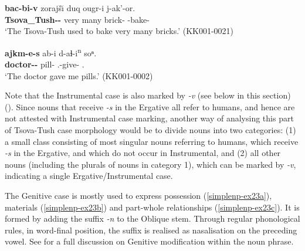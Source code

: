 \begin{exe}
	\ex\label{simplenp-ex22}
	\begin{xlist}
		

			\ex\label{simplenp-ex22a}
			\gll \textbf{bac-bi-v} zorajš\u{\i} duq ougr-i j-ak'-or. \\
			\textbf{Tsova\_Tush-{\Pl}-{\Erg}} very many brick-{\Pl} {\J}-bake-{\Imprf} \\
			\trans `The Tsova-Tush used to bake very many bricks.'
			\hfill (KK001-0021)

		

			\ex\label{simplenp-ex22b}
			\gll \textbf{ajkm-e-s} ab-i d-aɬ-i\textsuperscript{n} soⁿ. \\
			\textbf{doctor-{\Obl}-{\Erg}} pill-{\Pl} {\B}.{\Pl}-give-{\Aor} {\Fsg}.{\Dat} \\
			\trans `The doctor gave me pills.'
			\hfill (KK001-0002)

		
	\end{xlist}
\end{exe}

Note that the Instrumental case is also marked by \textit{-v} (see below in this section) (\cite{gagua48erg}). Since nouns that receive \textit{-s} in the Ergative all refer to humans, and hence are not attested with Instrumental case marking, another way of analysing this part of Tsova-Tush case morphology would be to divide nouns into two categories: (1) a small class consisting of most singular nouns referring to humans, which receive \textit{-s} in the Ergative, and which do not occur in Instrumental, and (2) all other nouns (including the plurals of nouns in category 1), which can be marked by \textit{-v}, indicating a single Ergative/Instrumental case.

The Genitive case is mostly used to express possession (\ref{simplenp-ex23a}), materials (\ref{simplenp-ex23b}) and part-whole relationships (\ref{simplenp-ex23c}). It is formed by adding the suffix \textit{-n} to the Oblique stem. Through regular phonological rules, in word-final position, the suffix is realised as nasalisation on the preceding vowel. See  for a full discussion on Genitive modification within the noun phrase.

